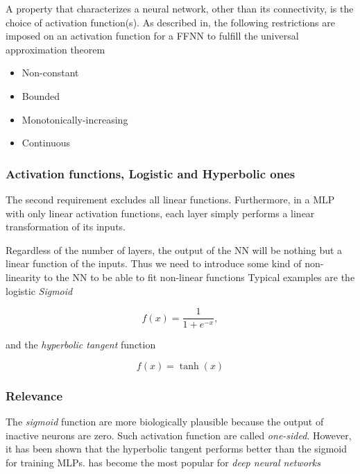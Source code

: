 \documentclass[11pt]{article}
\begin{document}
A property that characterizes a neural network, other than its
connectivity, is the choice of activation function(s). As described in,
the following restrictions are imposed on an activation function for a
FFNN to fulfill the universal approximation theorem

\begin{itemize}
\item
  Non-constant
\item
  Bounded
\item
  Monotonically-increasing
\item
  Continuous
\end{itemize}

\hypertarget{activation-functions-logistic-and-hyperbolic-ones}{%
\subsubsection{Activation functions, Logistic and Hyperbolic
ones}\label{activation-functions-logistic-and-hyperbolic-ones}}

The second requirement excludes all linear functions. Furthermore, in a
MLP with only linear activation functions, each layer simply performs a
linear transformation of its inputs.

Regardless of the number of layers, the output of the NN will be nothing
but a linear function of the inputs. Thus we need to introduce some kind
of non-linearity to the NN to be able to fit non-linear functions
Typical examples are the logistic \emph{Sigmoid}

    \[
f(x) = \frac{1}{1 + e^{-x}},
\]

    and the \emph{hyperbolic tangent} function

    \[
f(x) = \tanh(x)
\]

    \hypertarget{relevance}{%
\subsubsection{Relevance}\label{relevance}}

The \emph{sigmoid} function are more biologically plausible because the
output of inactive neurons are zero. Such activation function are called
\emph{one-sided}. However, it has been shown that the hyperbolic tangent
performs better than the sigmoid for training MLPs. has become the most
popular for \emph{deep neural networks}
\end{document}
